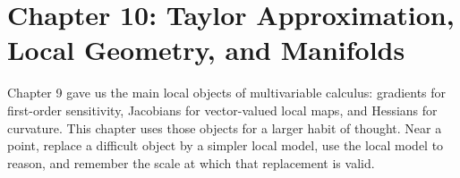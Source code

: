 \section{Chapter 10: Taylor Approximation, Local Geometry, and Manifolds}
\label{ch:taylor-local-geometry-manifolds}

Chapter 9 gave us the main local objects of multivariable calculus: gradients for first-order sensitivity, Jacobians for vector-valued local maps, and Hessians for curvature. This chapter uses those objects for a larger habit of thought. Near a point, replace a difficult object by a simpler local model, use the local model to reason, and remember the scale at which that replacement is valid.

